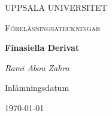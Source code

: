 \begin{titlepage}

  \centering
	{\scshape\LARGE UPPSALA UNIVERSITET\par}
	\vspace{1cm}
  {\scshape\Large {Föreläsningsateckningar} \par}
	\vspace{1.5cm}
  {\huge\bfseries {Finasiella Derivat} \par}
	\vspace{2cm}
	{\Large\itshape Rami Abou Zahra \par}
	\vfill
  \vfill


  {\large Inlämningsdatum}\par
  {\today}

\end{titlepage}
